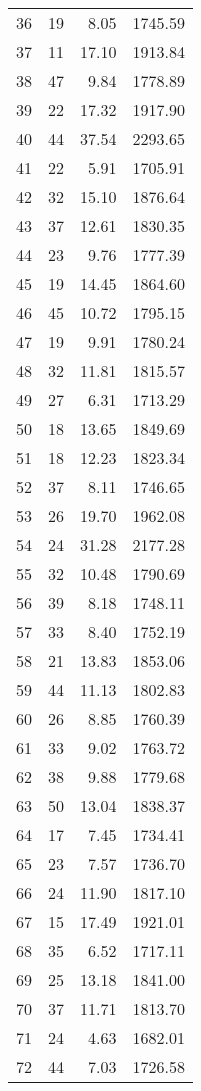 \begin{appendix}
\begin{longtable}{rrrr}
36 & 19 & 8.05 & 1745.59 \\
37 & 11 & 17.10 & 1913.84 \\
38 & 47 & 9.84 & 1778.89 \\
39 & 22 & 17.32 & 1917.90 \\
40 & 44 & 37.54 & 2293.65 \\
41 & 22 & 5.91 & 1705.91 \\
42 & 32 & 15.10 & 1876.64 \\
43 & 37 & 12.61 & 1830.35 \\
44 & 23 & 9.76 & 1777.39 \\
45 & 19 & 14.45 & 1864.60 \\
46 & 45 & 10.72 & 1795.15 \\
47 & 19 & 9.91 & 1780.24 \\
48 & 32 & 11.81 & 1815.57 \\
49 & 27 & 6.31 & 1713.29 \\
50 & 18 & 13.65 & 1849.69 \\
51 & 18 & 12.23 & 1823.34 \\
52 & 37 & 8.11 & 1746.65 \\
53 & 26 & 19.70 & 1962.08 \\
54 & 24 & 31.28 & 2177.28 \\
55 & 32 & 10.48 & 1790.69 \\
56 & 39 & 8.18 & 1748.11 \\
57 & 33 & 8.40 & 1752.19 \\
58 & 21 & 13.83 & 1853.06 \\
59 & 44 & 11.13 & 1802.83 \\
60 & 26 & 8.85 & 1760.39 \\
61 & 33 & 9.02 & 1763.72 \\
62 & 38 & 9.88 & 1779.68 \\
63 & 50 & 13.04 & 1838.37 \\
64 & 17 & 7.45 & 1734.41 \\
65 & 23 & 7.57 & 1736.70 \\
66 & 24 & 11.90 & 1817.10 \\
67 & 15 & 17.49 & 1921.01 \\
68 & 35 & 6.52 & 1717.11 \\
69 & 25 & 13.18 & 1841.00 \\
70 & 37 & 11.71 & 1813.70 \\
71 & 24 & 4.63 & 1682.01 \\
72 & 44 & 7.03 & 1726.58 \\
\bottomrule
\end{longtable}


\end{appendix}
